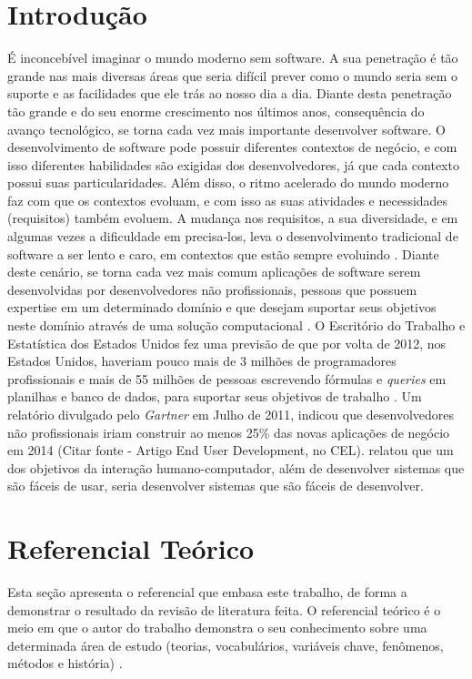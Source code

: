 \chapter[Introdução]{Introdução}

É inconcebível imaginar o mundo moderno sem software. A sua penetração é tão grande nas mais diversas áreas que seria difícil prever como o mundo seria sem o suporte e as facilidades que ele trás ao nosso dia a dia. Diante desta penetração tão grande e do seu enorme crescimento nos últimos anos, consequência do avanço tecnológico, se torna cada vez mais importante desenvolver software. O desenvolvimento de software pode possuir diferentes contextos de negócio, e com isso diferentes habilidades são exigidas dos desenvolvedores, já que cada contexto possui suas particularidades. Além disso, o ritmo acelerado do mundo moderno faz com que os contextos evoluam, e com isso as suas atividades e necessidades (requisitos) também evoluem. A mudança nos requisitos, a sua diversidade, e em algumas vezes a dificuldade em precisa-los, leva o desenvolvimento tradicional de software a ser lento e caro, em contextos que estão sempre evoluindo \cite{lieberman2006}. Diante deste cenário, se torna cada vez mais comum aplicações de software serem desenvolvidas por desenvolvedores não profissionais, pessoas que possuem expertise em um determinado domínio e que desejam suportar seus objetivos neste domínio através de uma solução computacional \cite{lieberman2006}. O Escritório do Trabalho e Estatística dos Estados Unidos fez uma previsão de que por volta de 2012, nos Estados Unidos, haveriam pouco mais de 3 milhões de programadores profissionais e mais de 55 milhões de pessoas escrevendo fórmulas e \textit{queries} em planilhas e banco de dados, para suportar seus objetivos de trabalho \cite{scaffidi2005}. Um relatório divulgado pelo \textit{Gartner} em Julho de 2011, indicou que desenvolvedores não profissionais iriam construir ao menos 25\% das novas aplicações de negócio em 2014 (Citar fonte - Artigo End User Development, no CEL).  relatou que um dos objetivos da interação humano-computador, além de desenvolver sistemas que são fáceis de usar, seria desenvolver sistemas que são fáceis de desenvolver.


\chapter[Referencial Teórico]{Referencial Teórico}

Esta seção apresenta o referencial que embasa este trabalho, de forma a demonstrar o resultado da revisão de literatura feita. O referencial teórico é o meio em que o autor do trabalho demonstra o seu conhecimento sobre uma determinada área de estudo (teorias, vocabulários, variáveis chave, fenômenos, métodos e história) \cite{randolph2009}.

